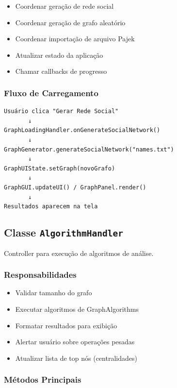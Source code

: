\documentclass[12pt,a4paper]{article}
\begin{document}
\begin{itemize}
    \item Coordenar geração de rede social
    \item Coordenar geração de grafo aleatório
    \item Coordenar importação de arquivo Pajek
    \item Atualizar estado da aplicação
    \item Chamar callbacks de progresso
\end{itemize}

\subsubsection{Fluxo de Carregamento}

\begin{verbatim}
Usuário clica "Gerar Rede Social"
       ↓
GraphLoadingHandler.onGenerateSocialNetwork()
       ↓
GraphGenerator.generateSocialNetwork("names.txt")
       ↓
GraphUIState.setGraph(novoGrafo)
       ↓
GraphGUI.updateUI() / GraphPanel.render()
       ↓
Resultados aparecem na tela
\end{verbatim}

\subsection{Classe \texttt{AlgorithmHandler}}

Controller para execução de algoritmos de análise.

\subsubsection{Responsabilidades}

\begin{itemize}
    \item Validar tamanho do grafo
    \item Executar algoritmos de GraphAlgorithms
    \item Formatar resultados para exibição
    \item Alertar usuário sobre operações pesadas
    \item Atualizar lista de top nós (centralidades)
\end{itemize}

\subsubsection{Métodos Principais}
\end{document}
